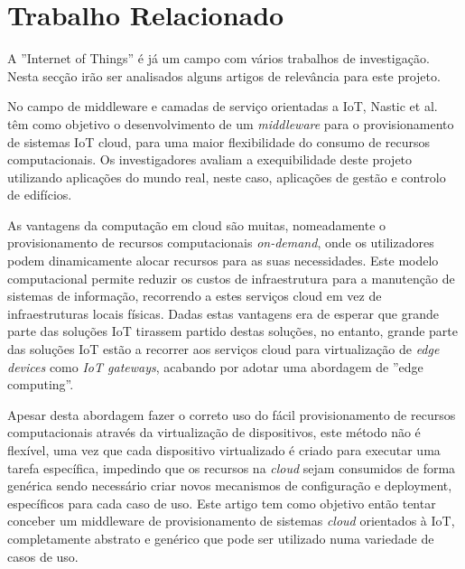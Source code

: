 \section{Trabalho Relacionado}
A ''Internet of Things'' é já um campo com vários trabalhos de investigação. Nesta secção irão ser analisados alguns artigos de relevância para este projeto.


No campo de middleware e camadas de serviço orientadas a IoT, Nastic et al. \cite{iot-provision} têm como objetivo o desenvolvimento de um \textit{middleware} para o provisionamento de sistemas IoT cloud, para uma maior flexibilidade do consumo de recursos computacionais. Os investigadores avaliam a exequibilidade deste projeto utilizando aplicações do mundo real, neste caso, aplicações de gestão e controlo de edifícios.

As vantagens da computação em cloud são muitas, nomeadamente o provisionamento de recursos computacionais \textit{on-demand}, onde os utilizadores podem dinamicamente alocar recursos para as suas necessidades. Este modelo computacional permite reduzir os custos de infraestrutura para a manutenção de sistemas de informação, recorrendo a estes serviços cloud em vez de infraestruturas locais físicas. Dadas estas vantagens era de esperar que grande parte das soluções IoT tirassem partido destas soluções, no entanto, grande parte das soluções IoT estão a recorrer aos serviços cloud para virtualização de \textit{\textit{edge devices}} como \textit{IoT gateways}, acabando por adotar uma abordagem de ''edge computing''.

Apesar desta abordagem fazer o correto uso do fácil provisionamento de recursos computacionais através da virtualização de dispositivos, este método não é flexível, uma vez que cada dispositivo virtualizado é criado para executar uma tarefa específica, impedindo que os recursos na \textit{cloud} sejam consumidos de forma genérica sendo necessário criar novos mecanismos de configuração e deployment, específicos para cada caso de uso. Este artigo tem como objetivo então tentar conceber um middleware de provisionamento de sistemas \textit{cloud} orientados à IoT, completamente abstrato e genérico que pode ser utilizado numa variedade de casos de uso.

\begin{comment}
Grande parte das abordagens de provisionamento de recursos \textit{cloud} não providenciam soluções totais para as características dos sistemas que fazem uso das infraestruturas \textit{cloud}, nomeadamente a variedade, a distribuição geográfica e dimensão destes. Muitas vezes durante a implementação de tais sistemas é preciso recorrer a vários softwares de provisionamento para alocar recursos na \textit{cloud}, além disso,  muitas vezes é necessário a configuração manual dos \textit{edge devices}, e por vezes, presença física no local para configurar tais dispositivos.
\end{comment}

